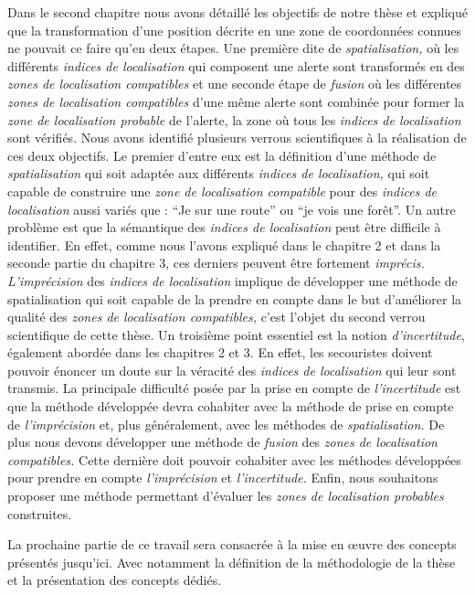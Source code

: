 Dans le second chapitre nous avons détaillé les objectifs de notre
thèse et expliqué que la transformation d'une position décrite en une
zone de coordonnées connues ne pouvait ce faire qu'en deux étapes. Une
première dite de \emph{spatialisation,} où les différents
\emph{indices de localisation} qui composent une alerte sont
transformés en des \emph{zones de localisation compatibles} et une
seconde étape de \emph{fusion} où les différentes \emph{zones de
  localisation compatibles} d'une même alerte sont combinée pour
former la \emph{zone de localisation probable} de l'alerte, \ie la
zone où tous les \emph{indices de localisation} sont vérifiés. Nous
avons identifié plusieurs verrous scientifiques à la réalisation de
ces deux objectifs. Le premier d'entre eux est la définition d'une
méthode de \emph{spatialisation} qui soit adaptée aux différents
\emph{indices de localisation,} \ie qui soit capable de construire une
\emph{zone de localisation compatible} pour des \emph{indices de
  localisation} aussi variés que : \enquote{Je sur une route} ou
\enquote{je vois une forêt}.  Un autre problème est que la sémantique
des \emph{indices de localisation} peut être difficile à
identifier. En effet, comme nous l'avons expliqué dans le chapitre 2
et dans la seconde partie du chapitre 3, ces derniers peuvent être
fortement \emph{imprécis.}  \emph{L'imprécision} des \emph{indices de
  localisation} implique de développer une méthode de spatialisation
qui soit capable de la prendre en compte dans le but d'améliorer la
qualité des \emph{zones de localisation compatibles,} c'est l'objet du
second verrou scientifique de cette thèse.  Un troisième point
essentiel est la notion \emph{d'incertitude}, également abordée dans
les chapitres 2 et 3. En effet, les secouristes doivent pouvoir
énoncer un doute sur la véracité des \emph{indices de localisation}
qui leur sont transmis. La principale difficulté posée par la prise en
compte de \emph{l'incertitude} est que la méthode développée devra
cohabiter avec la méthode de prise en compte de \emph{l'imprécision}
et, plus généralement, avec les méthodes de \emph{spatialisation.}  De
plus nous devons développer une méthode de \emph{fusion} des
\emph{zones de localisation compatibles.} Cette dernière doit pouvoir
cohabiter avec les méthodes développées pour prendre en compte
\emph{l'imprécision} et \emph{l'incertitude.} Enfin, nous souhaitons
proposer une méthode permettant d'évaluer les \emph{zones de
  localisation probables} construites.


La prochaine partie de ce travail sera consacrée à la mise en œuvre
des concepts présentés jusqu'ici. Avec notamment la définition de la
méthodologie de la thèse et la présentation des concepts dédiés.


